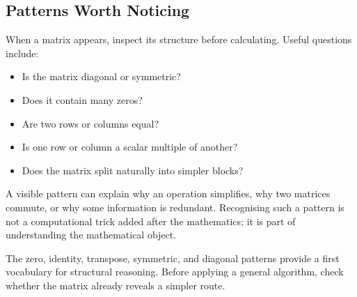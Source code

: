 \subsection{Patterns Worth Noticing}

When a matrix appears, inspect its structure before calculating. Useful questions
include:
\begin{itemize}
    \item Is the matrix diagonal or symmetric?
    \item Does it contain many zeros?
    \item Are two rows or columns equal?
    \item Is one row or column a scalar multiple of another?
    \item Does the matrix split naturally into simpler blocks?
\end{itemize}

\begin{interpretationbox}
A visible pattern can explain why an operation simplifies, why two matrices
commute, or why some information is redundant. Recognising such a pattern is not
a computational trick added after the mathematics; it is part of understanding
the mathematical object.
\end{interpretationbox}

\begin{summarybox}
The zero, identity, transpose, symmetric, and diagonal patterns provide a first
vocabulary for structural reasoning. Before applying a general algorithm, check
whether the matrix already reveals a simpler route.
\end{summarybox}
